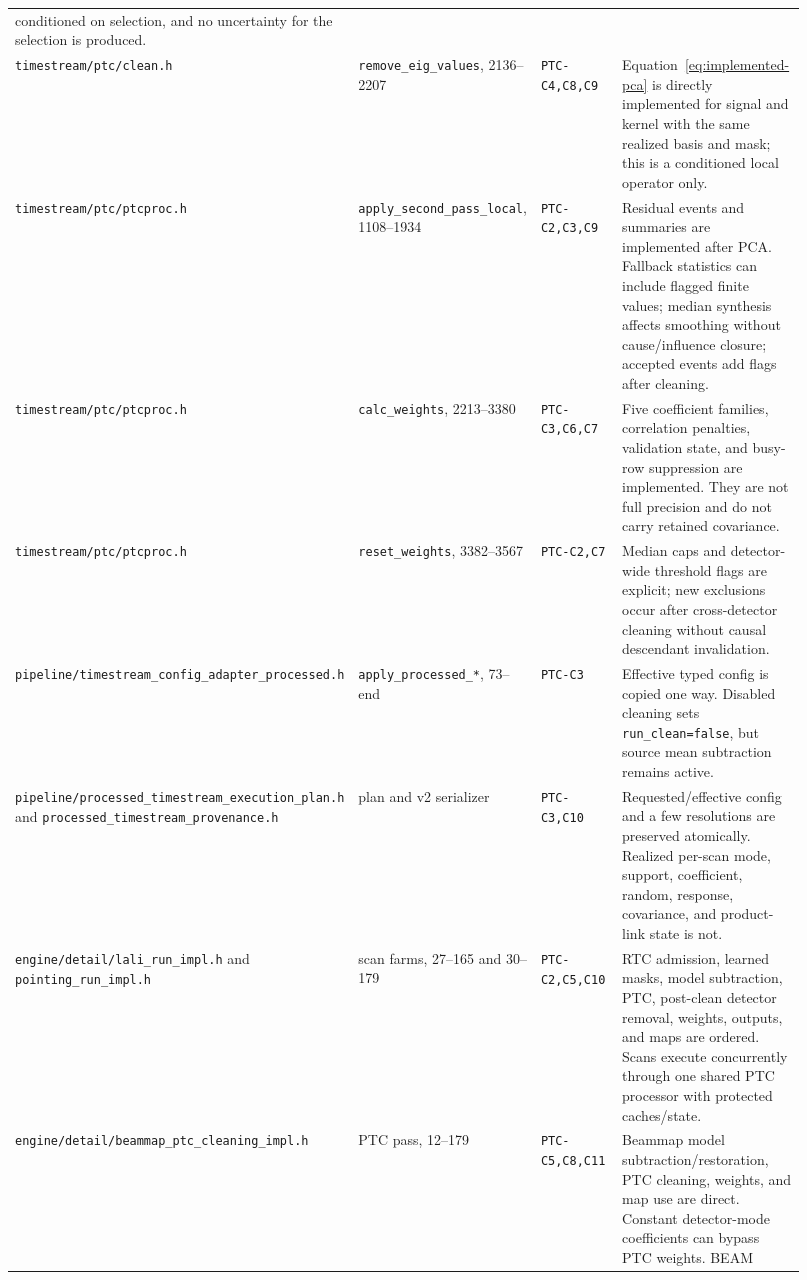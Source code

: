 \documentclass[11pt]{article}
\newcommand{\code}[1]{\nolinkurl{#1}}
\begin{document}
\begin{longtable}{L{0.255\linewidth}L{0.145\linewidth}L{0.19\linewidth}L{0.33\linewidth}}
conditioned on selection, and no uncertainty for the selection is produced.\\
\code{timestream/ptc/clean.h} &
\code{remove_eig_values}, 2136--2207 &
\code{PTC-C4,C8,C9} &
Equation~\eqref{eq:implemented-pca} is directly implemented for signal and
kernel with the same realized basis and mask; this is a conditioned local
operator only.\\
\code{timestream/ptc/ptcproc.h} &
\code{apply_second_pass_local}, 1108--1934 &
\code{PTC-C2,C3,C9} &
Residual events and summaries are implemented after PCA.  Fallback statistics
can include flagged finite values; median synthesis affects smoothing without
cause/influence closure; accepted events add flags after cleaning.\\
\code{timestream/ptc/ptcproc.h} &
\code{calc_weights}, 2213--3380 &
\code{PTC-C3,C6,C7} &
Five coefficient families, correlation penalties, validation state, and
busy-row suppression are implemented.  They are not full precision and do not
carry retained covariance.\\
\code{timestream/ptc/ptcproc.h} &
\code{reset_weights}, 3382--3567 &
\code{PTC-C2,C7} &
Median caps and detector-wide threshold flags are explicit; new exclusions
occur after cross-detector cleaning without causal descendant invalidation.\\
\code{pipeline/timestream_config_adapter_processed.h} &
\code{apply_processed_*}, 73--end &
\code{PTC-C3} &
Effective typed config is copied one way.  Disabled cleaning sets
\code{run_clean=false}, but source mean subtraction remains active.\\
\code{pipeline/processed_timestream_execution_plan.h} and
\code{processed_timestream_provenance.h} &
plan and v2 serializer &
\code{PTC-C3,C10} &
Requested/effective config and a few resolutions are preserved atomically.
Realized per-scan mode, support, coefficient, random, response, covariance, and
product-link state is not.\\
\code{engine/detail/lali_run_impl.h} and
\code{pointing_run_impl.h} &
scan farms, 27--165 and 30--179 &
\code{PTC-C2,C5,C10} &
RTC admission, learned masks, model subtraction, PTC, post-clean detector
removal, weights, outputs, and maps are ordered.  Scans execute concurrently
through one shared PTC processor with protected caches/state.\\
\code{engine/detail/beammap_ptc_cleaning_impl.h} &
PTC pass, 12--179 &
\code{PTC-C5,C8,C11} &
Beammap model subtraction/restoration, PTC cleaning, weights, and map use are
direct.  Constant detector-mode coefficients can bypass PTC weights.  BEAM

\end{longtable}
\end{document}
